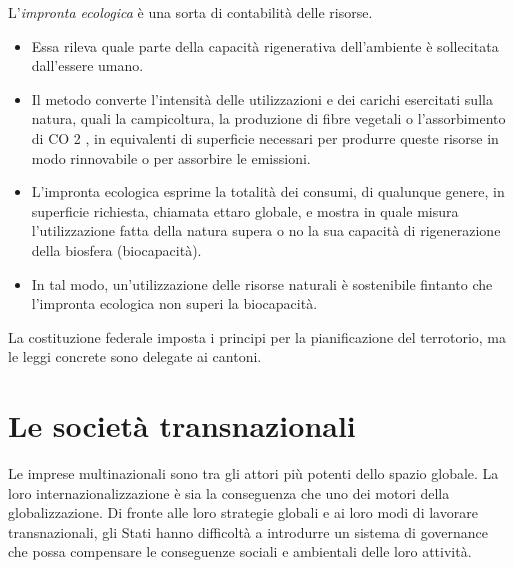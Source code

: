 \documentclass[a4paper]{article}
\begin{document}
L'\textit{impronta ecologica} è una sorta di contabilità delle risorse.
\begin{itemize}
    \item Essa rileva quale parte della capacità rigenerativa
        dell'ambiente è sollecitata dall'essere umano.
    \item Il metodo converte l'intensità delle utilizzazioni e dei
        carichi esercitati sulla natura, quali la campicoltura, la
        produzione di fibre vegetali o l'assorbimento di CO 2 , in
        equivalenti di superficie necessari per produrre queste
        risorse in modo rinnovabile o per assorbire le emissioni.
    \item L'impronta ecologica esprime la totalità dei consumi, di qualunque
        genere, in superficie richiesta, chiamata ettaro globale, e mostra
        in quale misura l'utilizzazione fatta della natura supera o no la sua
        capacità di rigenerazione della biosfera (biocapacità). 
    \item In tal modo, un'utilizzazione delle risorse naturali è sostenibile
        fintanto che l'impronta ecologica non superi la biocapacità.
\end{itemize}


La costituzione federale imposta i principi per la pianificazione del terrotorio,
ma le leggi concrete sono delegate ai cantoni.

\pagebreak

\section{Le società transnazionali}

Le imprese multinazionali sono tra gli attori più potenti dello spazio globale. La loro
internazionalizzazione è sia la conseguenza che uno dei motori della globalizzazione. Di fronte alle loro
strategie globali e ai loro modi di lavorare transnazionali, gli Stati hanno difficoltà a introdurre un
sistema di governance che possa compensare le conseguenze sociali e ambientali delle loro attività.

\end{document}
